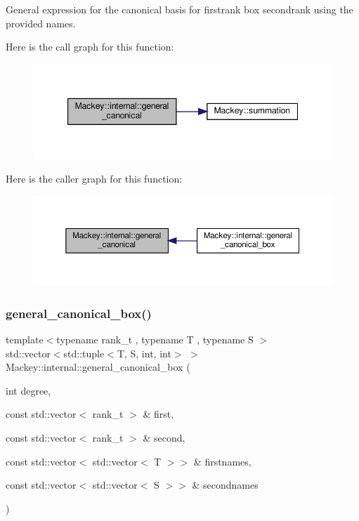 General expression for the canonical basis for firstrank box secondrank using the provided names. 

Here is the call graph for this function\+:\nopagebreak
\begin{figure}[H]
\begin{center}
\leavevmode
\includegraphics[width=347pt]{namespaceMackey_1_1internal_a34dd271be1fcbda4ca21877094697796_cgraph}
\end{center}
\end{figure}
Here is the caller graph for this function\+:\nopagebreak
\begin{figure}[H]
\begin{center}
\leavevmode
\includegraphics[width=350pt]{namespaceMackey_1_1internal_a34dd271be1fcbda4ca21877094697796_icgraph}
\end{center}
\end{figure}
\mbox{\label{namespaceMackey_1_1internal_a2c420c10c78dcc4f9ae579bad1cd2e45}} 
\subsubsection{\texorpdfstring{general\+\_\+canonical\+\_\+box()}{general\_canonical\_box()}\hspace{0.1cm}{\footnotesize\ttfamily [1/2]}}
{\footnotesize\ttfamily template$<$typename rank\+\_\+t , typename T , typename S $>$ \\
std\+::vector$<$std\+::tuple$<$T, S, int, int$>$ $>$ Mackey\+::internal\+::general\+\_\+canonical\+\_\+box (\begin{DoxyParamCaption}\item[{int}]{degree,  }\item[{const std\+::vector$<$ rank\+\_\+t $>$ \&}]{first,  }\item[{const std\+::vector$<$ rank\+\_\+t $>$ \&}]{second,  }\item[{const std\+::vector$<$ std\+::vector$<$ T $>$$>$ \&}]{firstnames,  }\item[{const std\+::vector$<$ std\+::vector$<$ S $>$$>$ \&}]{secondnames }\end{DoxyParamCaption})}



